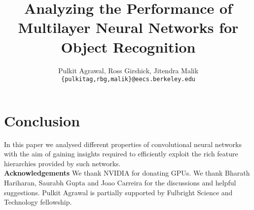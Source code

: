 \documentclass[runningheads]{llncs}
\begin{document}
\pagestyle{headings}
\mainmatter
\title{Analyzing the Performance of Multilayer Neural Networks for Object Recognition} %




\author{Pulkit Agrawal, Ross Girshick, Jitendra Malik\\
\texttt{\{pulkitag,rbg,malik\}@eecs.berkeley.edu}}


\maketitle











\section{Conclusion}
\label{sec:conclusion}
In this paper we analysed different properties of convolutional neural networks with the aim of gaining insights required to efficiently exploit the rich feature hierarchies provided by such networks. \\

\noindent \textbf{Acknowledgements}
We thank NVIDIA for donating GPUs. We thank Bharath Hariharan, Saurabh Gupta and Joao Carreira for the discussions and helpful suggestions. Pulkit Agrawal is partially supported by Fulbright Science and Technology fellowship.  




\end{document}
